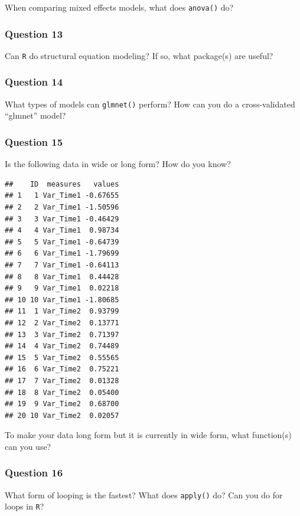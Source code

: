 \documentclass[]{tufte-book}
\theoremstyle{definition}
\theoremstyle{definition}
\theoremstyle{remark}
\begin{document}
When comparing mixed effects models, what does \texttt{anova()} do?

\subsubsection*{Question 13}\label{question-13}

Can \texttt{R} do structural equation modeling? If so, what package(s)
are useful?

\subsubsection*{Question 14}\label{question-14}

What types of models can \texttt{glmnet()} perform? How can you do a
cross-validated ``glmnet'' model?

\subsubsection*{Question 15}\label{question-15}

Is the following data in wide or long form? How do you know?

\begin{verbatim}
##    ID  measures   values
## 1   1 Var_Time1 -0.67655
## 2   2 Var_Time1 -1.50596
## 3   3 Var_Time1 -0.46429
## 4   4 Var_Time1  0.98734
## 5   5 Var_Time1 -0.64739
## 6   6 Var_Time1 -1.79699
## 7   7 Var_Time1 -0.64113
## 8   8 Var_Time1  0.44428
## 9   9 Var_Time1  0.02218
## 10 10 Var_Time1 -1.80685
## 11  1 Var_Time2  0.93799
## 12  2 Var_Time2  0.13771
## 13  3 Var_Time2  0.71397
## 14  4 Var_Time2  0.74489
## 15  5 Var_Time2  0.55565
## 16  6 Var_Time2  0.75221
## 17  7 Var_Time2  0.01328
## 18  8 Var_Time2  0.05400
## 19  9 Var_Time2  0.68700
## 20 10 Var_Time2  0.02057
\end{verbatim}

To make your data long form but it is currently in wide form, what
function(s) can you use?

\subsubsection*{Question 16}\label{question-16}

What form of looping is the fastest? What does \texttt{apply()} do? Can
you do for loops in \texttt{R}?
\end{document}
